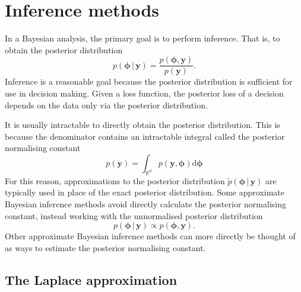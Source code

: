 \documentclass[a4paper, nobind]{templates/ociamthesis}
\newcommand{\y}{\mathbf{y}}
\newcommand{\bphi}{\bm{\phi}}
\begin{document}
\hypertarget{inference-methods}{%
\section{Inference methods}\label{inference-methods}}

In a Bayesian analysis, the primary goal is to perform inference.
That is, to obtain the posterior distribution
\begin{equation}
p(\bphi \, | \, \y) = \frac{p(\bphi, \y)}{p(\y)}.
\end{equation}
Inference is a reasonable goal because the posterior distribution is sufficient for use in decision making.
Given a loss function, the posterior loss of a decision depends on the data only via the posterior distribution.

It is usually intractable to directly obtain the posterior distribution.
This is because the denominator contains an intractable integral called the posterior normalising constant
\begin{equation}
p(\y) = \int_{\mathbb{R}^d} p(\y, \bphi) \text{d}\bphi \label{eq:evidence}
\end{equation}
For this reason, approximations to the posterior distribution \(\tilde p(\bphi \, | \, \y)\) are typically used in place of the exact posterior distribution.
Some approximate Bayesian inference methods avoid directly calculate the posterior normalising constant, instead working with the unnormalised posterior distribution
\begin{equation}
p(\bphi \, | \, \y) \propto p(\bphi, \y).
\end{equation}
Other approximate Bayesian inference methods can more directly be thought of as ways to estimate the posterior normalising constant.

\hypertarget{the-laplace-approximation}{%
\subsection{The Laplace approximation}\label{the-laplace-approximation}}
\end{document}
